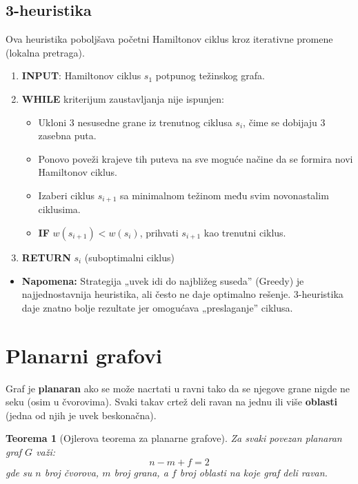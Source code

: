 \documentclass[a4paper,12pt,twoside]{report}
\newtheorem{theorem}{Teorema}[section]
\numberwithin{algorithm}{section}
\begin{document}
\subsection*{3-heuristika}
Ova heuristika poboljšava početni Hamiltonov ciklus kroz iterativne promene (lokalna pretraga).

\begin{algorithm}[ht]
    \caption{3-heuristika za TSP}
    \begin{enumerate}
        \item \textbf{INPUT}: Hamiltonov ciklus $s_1$ potpunog težinskog grafa.
        \item \textbf{WHILE} kriterijum zaustavljanja nije ispunjen:
        \begin{itemize}
            \item Ukloni 3 nesusedne grane iz trenutnog ciklusa $s_i$, čime se dobijaju 3 zasebna puta.
            \item Ponovo poveži krajeve tih puteva na sve moguće načine da se formira novi Hamiltonov ciklus.
            \item Izaberi ciklus $s_{i+1}$ sa minimalnom težinom među svim novonastalim ciklusima.
            \item \textbf{IF} $w(s_{i+1}) < w(s_i)$, prihvati $s_{i+1}$ kao trenutni ciklus.
        \end{itemize}
        \item \textbf{RETURN} $s_i$ (suboptimalni ciklus)
    \end{enumerate}
\end{algorithm}

\begin{itemize}
    \item \textbf{Napomena:} Strategija „uvek idi do najbližeg suseda” (Greedy) je najjednostavnija heuristika, ali često ne daje optimalno rešenje. 3-heuristika daje znatno bolje rezultate jer omogućava „preslaganje” ciklusa.
\end{itemize}
\newpage
\section{Planarni grafovi}
Graf je \textbf{planaran} ako se može nacrtati u ravni tako da se njegove grane nigde ne seku (osim u čvorovima). Svaki takav crtež deli ravan na jednu ili više \textbf{oblasti} (jedna od njih je uvek beskonačna).



\begin{theorem}[Ojlerova teorema za planarne grafove]
    Za svaki povezan planaran graf $G$ važi:
    $$n - m + f = 2$$
    gde su $n$ broj čvorova, $m$ broj grana, a $f$ broj oblasti na koje graf deli ravan.
\end{theorem}
\end{document}
